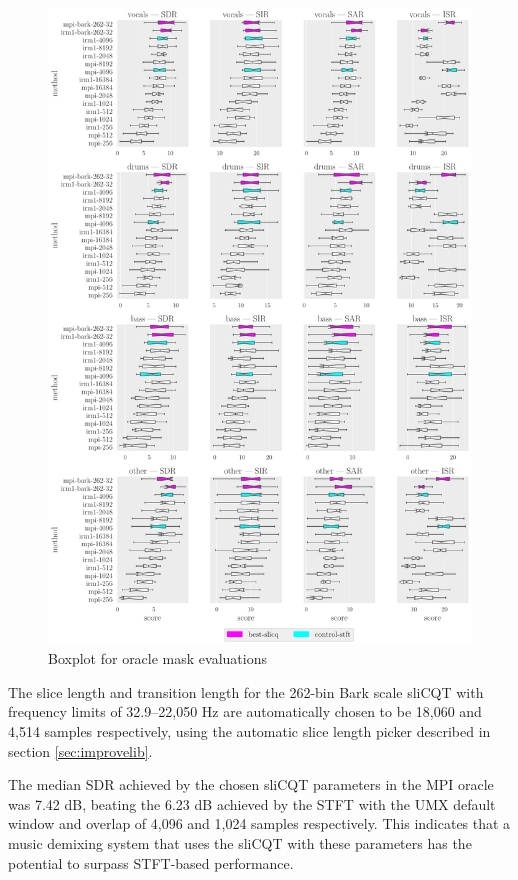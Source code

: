 \documentclass[report.tex]{subfiles}
\begin{document}
\begin{figure}[ht]
	\centering
	\includegraphics[width=\textwidth]{./images-bss/oracle_boxplot.pdf}
	\caption{Boxplot for oracle mask evaluations}
	\label{fig:oraclebssboxplot}
\end{figure}

The slice length and transition length for the 262-bin Bark scale sliCQT with frequency limits of 32.9--22,050 Hz are automatically chosen to be 18,060 and 4,514 samples respectively, using the automatic slice length picker described in section \ref{sec:improvelib}.

The median SDR achieved by the chosen sliCQT parameters in the MPI oracle was 7.42 dB, beating the 6.23 dB achieved by the STFT with the UMX default window and overlap of 4,096 and 1,024 samples respectively. This indicates that a music demixing system that uses the sliCQT with these parameters has the potential to surpass STFT-based performance.
\end{document}
